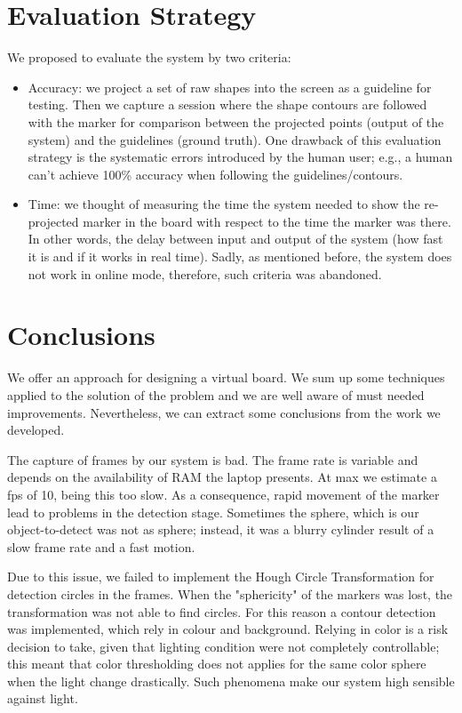 \documentclass[a4paper,12pt]{article}
\begin{document}
\section{Evaluation Strategy}
We proposed to evaluate the system by two criteria:
\begin{itemize}
\item Accuracy: we project a set of raw shapes into the screen as a guideline for testing. Then we capture a session where the shape contours are followed with the marker for comparison between the projected points (output of the system) and the guidelines (ground truth). One drawback of this evaluation strategy is the systematic errors introduced by the human user; e.g., a human can't achieve 100\% accuracy when following the guidelines/contours.
\item Time: we thought of measuring the time the system needed to show the re-projected marker in the board with respect to the time the marker was there. In other words, the delay between input and output of the system (how fast it is and if it works in real time). Sadly, as mentioned before, the system does not work in online mode, therefore, such criteria was abandoned.
\end{itemize}
\section{Conclusions}
We offer an approach for designing a virtual board. We sum up some techniques applied to the solution of the problem and we are well aware of must needed improvements. Nevertheless, we can extract some conclusions from the work we developed.


The capture of frames by our system is bad. The frame rate is variable and depends on the availability of RAM the laptop presents. At max we estimate a fps of 10, being this too slow. As a consequence, rapid movement of the marker lead to problems in the detection stage. Sometimes the sphere, which is our object-to-detect was not as sphere; instead, it was a blurry cylinder result of a slow frame rate and a fast motion.


Due to this issue, we failed to implement the Hough Circle Transformation for detection circles in the frames. When the "sphericity" of the markers was lost, the transformation was not able to find circles. For this reason a contour detection was implemented, which rely in colour and background. Relying in color is a risk decision to take, given that lighting condition were not completely controllable; this meant that color thresholding does not applies for the same color sphere when the light change drastically. Such phenomena make our system high sensible against light.
\end{document}
